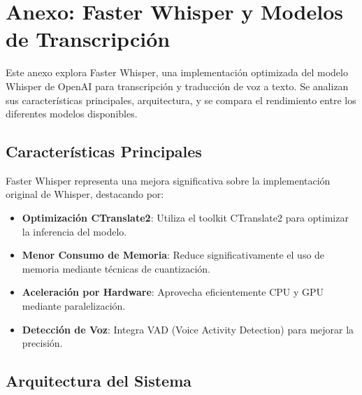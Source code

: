 \chapter{Anexo: Faster Whisper y Modelos de Transcripción}
\label{anexo-faster-whisper}

Este anexo explora Faster Whisper, una implementación optimizada del modelo Whisper de OpenAI para transcripción y traducción de voz a texto. Se analizan sus características principales, arquitectura, y se compara el rendimiento entre los diferentes modelos disponibles.

\section{Características Principales}
\label{sec:faster-whisper-features}

Faster Whisper representa una mejora significativa sobre la implementación original de Whisper, destacando por:

\begin{itemize}
	\item \textbf{Optimización CTranslate2}: Utiliza el toolkit CTranslate2 para optimizar la inferencia del modelo.
	\item \textbf{Menor Consumo de Memoria}: Reduce significativamente el uso de memoria mediante técnicas de cuantización.
	\item \textbf{Aceleración por Hardware}: Aprovecha eficientemente CPU y GPU mediante paralelización.
	\item \textbf{Detección de Voz}: Integra VAD (Voice Activity Detection) para mejorar la precisión.
\end{itemize}

\section{Arquitectura del Sistema}
\label{sec:faster-whisper-architecture}


